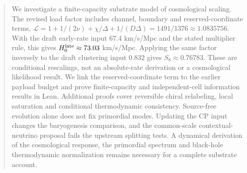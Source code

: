 \begin{abstract}
We investigate a finite-capacity substrate model of cosmological scaling. The revised load factor includes channel, boundary and reserved-coordinate terms,
$\mathcal L=1+1/(2\nu)+\chi/\Delta+1/(D\Delta)=1491/1376\approx1.0835756$.
With the draft early-rate input $67.4$ km/s/Mpc and the stated multiplier rule, this gives $H_0^{\rm late}\approx73.03$ km/s/Mpc. Applying the same factor inversely to the draft clustering input $0.832$ gives $S_8\approx0.76783$. These are conditional rescalings, not an absolute-rate derivation or a cosmological likelihood result. We link the reserved-coordinate term to the earlier payload budget and prove finite-capacity and independent-cell information results in Lean. Additional proofs cover reversible chiral relabeling, local saturation and conditional thermodynamic consistency. Source-free evolution alone does not fix primordial modes. Updating the CP input changes the baryogenesis comparison, and the common-scale contextual-neutrino proposal fails the upstream splitting tests. A dynamical derivation of the cosmological response, the primordial spectrum and black-hole thermodynamic normalization remains necessary for a complete substrate account.
\end{abstract}
